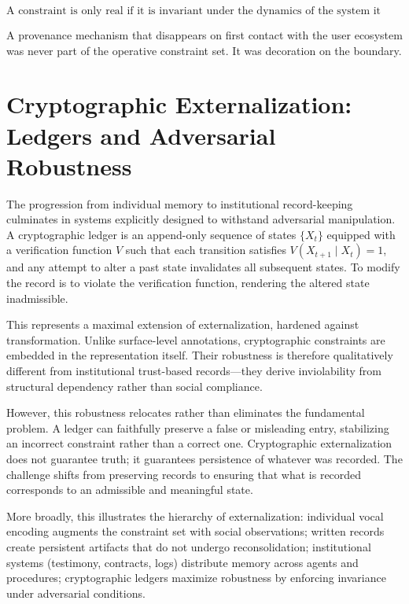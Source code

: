 \documentclass[12pt, letterpaper]{article}
\theoremstyle{flyxion}
\begin{document}
\begin{equation}
\text{A constraint is only real if it is invariant under the dynamics of the system it inhabits.}
\end{equation}

A provenance mechanism that disappears on first contact with the user ecosystem was never part of the operative constraint set. It was decoration on the boundary.

\section{Cryptographic Externalization: Ledgers and Adversarial Robustness}

The progression from individual memory to institutional record-keeping culminates in systems explicitly designed to withstand adversarial manipulation. A cryptographic ledger is an append-only sequence of states $\{X_t\}$ equipped with a verification function $V$ such that each transition satisfies $V(X_{t+1} \mid X_t) = 1$, and any attempt to alter a past state invalidates all subsequent states. To modify the record is to violate the verification function, rendering the altered state inadmissible.

This represents a maximal extension of externalization, hardened against transformation. Unlike surface-level annotations, cryptographic constraints are embedded in the representation itself. Their robustness is therefore qualitatively different from institutional trust-based records---they derive inviolability from structural dependency rather than social compliance.

However, this robustness relocates rather than eliminates the fundamental problem. A ledger can faithfully preserve a false or misleading entry, stabilizing an incorrect constraint rather than a correct one. Cryptographic externalization does not guarantee truth; it guarantees persistence of whatever was recorded. The challenge shifts from preserving records to ensuring that what is recorded corresponds to an admissible and meaningful state.

More broadly, this illustrates the hierarchy of externalization:
individual vocal encoding augments the constraint set with social observations;
written records create persistent artifacts that do not undergo reconsolidation;
institutional systems (testimony, contracts, logs) distribute memory across agents and procedures;
cryptographic ledgers maximize robustness by enforcing invariance under adversarial conditions.
\end{document}
